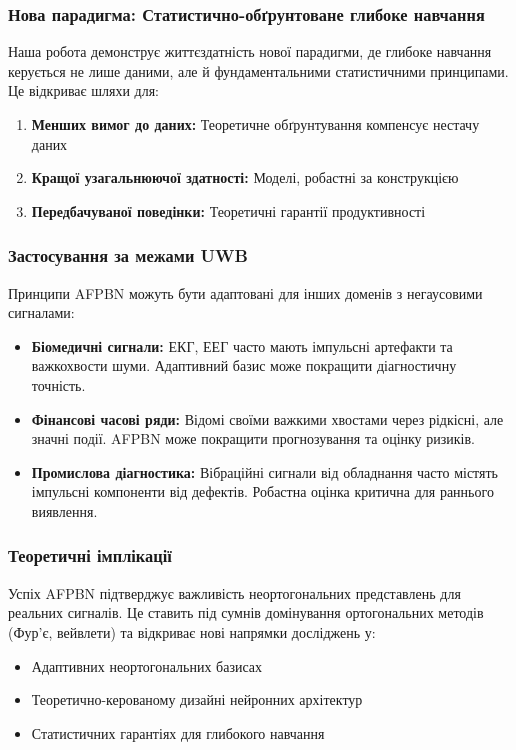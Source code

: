 \documentclass[12pt,a4paper]{article}
\begin{document}
\subsubsection{Нова парадигма: Статистично-обґрунтоване глибоке навчання}

Наша робота демонструє життєздатність нової парадигми, де глибоке навчання керується не лише даними, але й фундаментальними статистичними принципами. Це відкриває шляхи для:
\begin{enumerate}
	\item \textbf{Менших вимог до даних:} Теоретичне обґрунтування компенсує нестачу даних
	\item \textbf{Кращої узагальнюючої здатності:} Моделі, робастні за конструкцією
	\item \textbf{Передбачуваної поведінки:} Теоретичні гарантії продуктивності
\end{enumerate}

\subsubsection{Застосування за межами UWB}

Принципи AFPBN можуть бути адаптовані для інших доменів з негаусовими сигналами:

\begin{itemize}
	\item \textbf{Біомедичні сигнали:} ЕКГ, ЕЕГ часто мають імпульсні артефакти та важкохвости шуми. Адаптивний базис може покращити діагностичну точність.
	
	\item \textbf{Фінансові часові ряди:} Відомі своїми важкими хвостами через рідкісні, але значні події. AFPBN може покращити прогнозування та оцінку ризиків.
	
	\item \textbf{Промислова діагностика:} Вібраційні сигнали від обладнання часто містять імпульсні компоненти від дефектів. Робастна оцінка критична для раннього виявлення.
\end{itemize}

\subsubsection{Теоретичні імплікації}

Успіх AFPBN підтверджує важливість неортогональних представлень для реальних сигналів. Це ставить під сумнів домінування ортогональних методів (Фур'є, вейвлети) та відкриває нові напрямки досліджень у:
\begin{itemize}
	\item Адаптивних неортогональних базисах
	\item Теоретично-керованому дизайні нейронних архітектур
	\item Статистичних гарантіях для глибокого навчання
\end{itemize}
\end{document}
